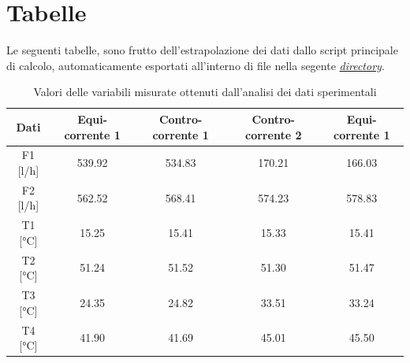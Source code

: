 \documentclass[a4paper,10pt]{article}                                                                                       %
\begin{document}
\section{Tabelle}                                                                                                           %
\label{sec:tables}                                                                                                          %
  Le seguenti tabelle, sono frutto dell'estrapolazione dei dati dallo script principale di calcolo, automaticamente
  esportati all'interno di file nella segente
  \textit{\href{https://github.com/CristianMerli/DataAnalysis/tree/master/final_doc/code_exports/output}{directory}}.
\begin{table}[H]                                                                                                            %
  \caption{Valori delle variabili misurate ottenuti dall'analisi dei dati sperimentali}                                     %
  \label{tab:measures_data}                                                                                                 %
  \vspace{3mm}                                                                                                              %
  \centering                                                                                                                %
  \begin{tabular}{||c|c|c|c|c||}                                                                                            %
    \hline
    Dati      & Equi-corrente 1 & Contro-corrente 1 & Contro-corrente 2 & Equi-corrente 1 \\
    \hline\hline
    F1 [l/h]  & 539.92          & 534.83            & 170.21            & 166.03          \\
    F2 [l/h]  & 562.52          & 568.41            & 574.23            & 578.83          \\
    T1 [°C]   & 15.25           & 15.41             & 15.33             & 15.41           \\
    T2 [°C]   & 51.24           & 51.52             & 51.30             & 51.47           \\
    T3 [°C]   & 24.35           & 24.82             & 33.51             & 33.24           \\
    T4 [°C]   & 41.90           & 41.69             & 45.01             & 45.50           \\
    \hline
  \end{tabular}                                                                                                             %
\end{table}                                                                                                                 %
\end{document}

